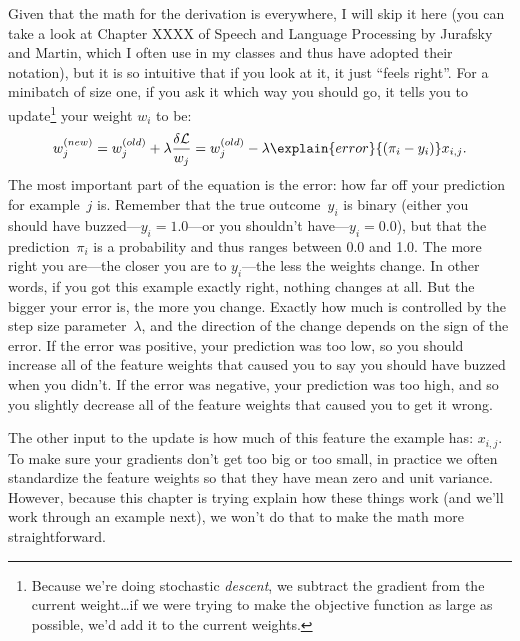 Given that the math for the derivation is everywhere, I will skip it here (you
can take a look at Chapter XXXX of Speech and Language Processing by Jurafsky
and Martin, which I often use in my classes and thus have adopted their
notation), but it is so intuitive that if you look at it, it just ``feels
right''.
%
For a minibatch of size one, if you ask it which way you should go, it tells
you to update\footnote{Because we're doing stochastic \emph{descent}, we
  subtract the gradient from the current weight\dots if we were trying to make
  the objective function as large as possible, we'd add it to the current
  weights.} your weight $w_i$ to be:
\begin{equation}
w_j^{(new)} = w_j^{(old)} + \lambda \frac{\delta \mathcal{L}}{{w_j}} =
w_j^{(old)} - \lambda \explain{error}{(\pi_i - y_i)} x_{i,j}.
  \label{eq:watson:update}
\end{equation}
The most important part of the equation is the error: how far off your
prediction for example~$j$ is.
%
Remember that the true outcome~$y_i$ is binary (either you should have
buzzed---$y_i=1.0$---or you shouldn't have---$y_i=0.0$), but that the
prediction~$\pi_i$ is a probability and thus ranges between 0.0 and 1.0.
%
The more right you are---the closer you are to $y_i$---the less the weights
change.
%
In other words, if you got this example exactly right, nothing changes at all.
%
But the bigger your error is, the more you change.
%
Exactly how much is controlled by the step size
parameter~$\lambda$, and the direction of the change depends on the sign of
the error.
%
If the error was positive, your prediction was too low, so you should increase all of the feature weights that caused you to
say you should have buzzed when you didn't.
%
If the error was negative, your prediction was too high, and so you slightly decrease all of the feature weights that
caused you to get it wrong.

The other input to the update is how much of this feature the example has:
$x_{i,j}$.
%
To make sure your gradients don't get too big or too small, in practice we often
standardize the feature weights so that they have mean zero and unit variance.
%
However, because this chapter is trying explain how these things work (and
we'll work through an example next), we won't do that to make the math more
straightforward.

